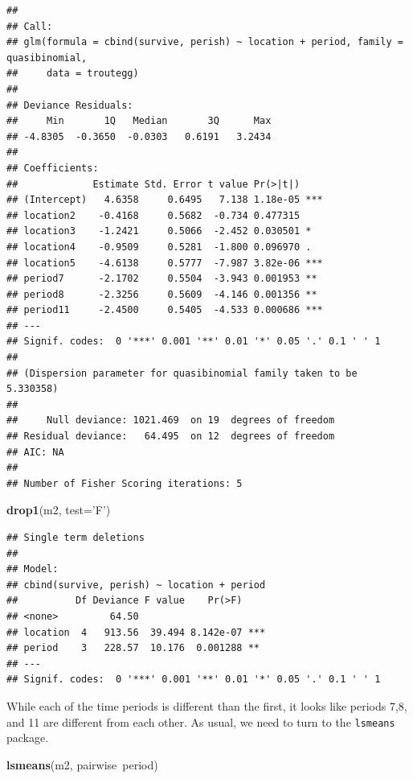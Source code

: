 \documentclass[]{book}
\newenvironment{Shaded}{\begin{snugshade}}{\end{snugshade}}
\newcommand{\KeywordTok}[1]{\textcolor[rgb]{0.13,0.29,0.53}{\textbf{{#1}}}}
\newcommand{\DataTypeTok}[1]{\textcolor[rgb]{0.13,0.29,0.53}{{#1}}}
\newcommand{\StringTok}[1]{\textcolor[rgb]{0.31,0.60,0.02}{{#1}}}
\newcommand{\NormalTok}[1]{{#1}}
\theoremstyle{definition}
\theoremstyle{definition}
\theoremstyle{remark}
\begin{document}
\begin{verbatim}
## 
## Call:
## glm(formula = cbind(survive, perish) ~ location + period, family = quasibinomial, 
##     data = troutegg)
## 
## Deviance Residuals: 
##     Min       1Q   Median       3Q      Max  
## -4.8305  -0.3650  -0.0303   0.6191   3.2434  
## 
## Coefficients:
##             Estimate Std. Error t value Pr(>|t|)    
## (Intercept)   4.6358     0.6495   7.138 1.18e-05 ***
## location2    -0.4168     0.5682  -0.734 0.477315    
## location3    -1.2421     0.5066  -2.452 0.030501 *  
## location4    -0.9509     0.5281  -1.800 0.096970 .  
## location5    -4.6138     0.5777  -7.987 3.82e-06 ***
## period7      -2.1702     0.5504  -3.943 0.001953 ** 
## period8      -2.3256     0.5609  -4.146 0.001356 ** 
## period11     -2.4500     0.5405  -4.533 0.000686 ***
## ---
## Signif. codes:  0 '***' 0.001 '**' 0.01 '*' 0.05 '.' 0.1 ' ' 1
## 
## (Dispersion parameter for quasibinomial family taken to be 5.330358)
## 
##     Null deviance: 1021.469  on 19  degrees of freedom
## Residual deviance:   64.495  on 12  degrees of freedom
## AIC: NA
## 
## Number of Fisher Scoring iterations: 5
\end{verbatim}

\begin{Shaded}
\begin{Highlighting}[]
\KeywordTok{drop1}\NormalTok{(m2, }\DataTypeTok{test=}\StringTok{'F'}\NormalTok{)}
\end{Highlighting}
\end{Shaded}

\begin{verbatim}
## Single term deletions
## 
## Model:
## cbind(survive, perish) ~ location + period
##          Df Deviance F value    Pr(>F)    
## <none>         64.50                      
## location  4   913.56  39.494 8.142e-07 ***
## period    3   228.57  10.176  0.001288 ** 
## ---
## Signif. codes:  0 '***' 0.001 '**' 0.01 '*' 0.05 '.' 0.1 ' ' 1
\end{verbatim}

While each of the time periods is different than the first, it looks
like periods 7,8, and 11 are different from each other. As usual, we
need to turn to the \texttt{lsmeans} package.

\begin{Shaded}
\begin{Highlighting}[]
\KeywordTok{lsmeans}\NormalTok{(m2, pairwise~period)}
\end{Highlighting}
\end{Shaded}
\end{document}
